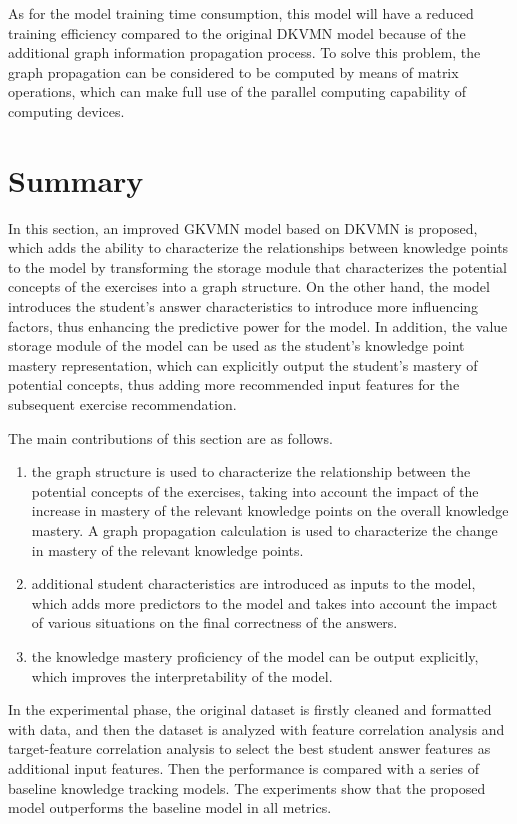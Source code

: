 As for the model training time consumption, this model will have a reduced training efficiency compared to the original DKVMN model because of the additional graph information propagation process. To solve this problem, the graph propagation can be considered to be computed by means of matrix operations, which can make full use of the parallel computing capability of computing devices.
\section{Summary}
In this section, an improved GKVMN model based on DKVMN is proposed, which adds the ability to characterize the relationships between knowledge points to the model by transforming the storage module that characterizes the potential concepts of the exercises into a graph structure. On the other hand, the model introduces the student's answer characteristics to introduce more influencing factors, thus enhancing the predictive power for the model. In addition, the value storage module of the model can be used as the student's knowledge point mastery representation, which can explicitly output the student's mastery of potential concepts, thus adding more recommended input features for the subsequent exercise recommendation.

The main contributions of this section are as follows.
\begin{enumerate}
    \item the graph structure is used to characterize the relationship between the potential concepts of the exercises, taking into account the impact of the increase in mastery of the relevant knowledge points on the overall knowledge mastery. A graph propagation calculation is used to characterize the change in mastery of the relevant knowledge points.
    \item additional student characteristics are introduced as inputs to the model, which adds more predictors to the model and takes into account the impact of various situations on the final correctness of the answers.
    \item the knowledge mastery proficiency of the model can be output explicitly, which improves the interpretability of the model.
\end{enumerate}

In the experimental phase, the original dataset is firstly cleaned and formatted with data, and then the dataset is analyzed with feature correlation analysis and target-feature correlation analysis to select the best student answer features as additional input features. Then the performance is compared with a series of baseline knowledge tracking models. The experiments show that the proposed model outperforms the baseline model in all metrics.
